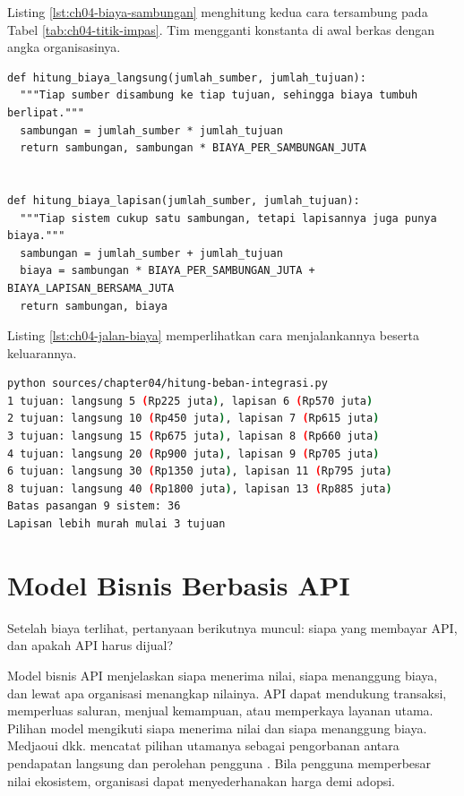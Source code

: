 \begin{pendalaman}[title={Pendalaman Teknis (opsional): Menghitung Titik Impas}]
Listing \ref{lst:ch04-biaya-sambungan} menghitung kedua cara tersambung pada Tabel \ref{tab:ch04-titik-impas}.
Tim mengganti konstanta di awal berkas dengan angka organisasinya.

\begin{lstlisting}[style=ch04python, caption={Biaya dua cara tersambung, tersedia di \berkas{sources/chapter04/hitung-beban-integrasi.py}}, label={lst:ch04-biaya-sambungan}]
def hitung_biaya_langsung(jumlah_sumber, jumlah_tujuan):
  """Tiap sumber disambung ke tiap tujuan, sehingga biaya tumbuh berlipat."""
  sambungan = jumlah_sumber * jumlah_tujuan
  return sambungan, sambungan * BIAYA_PER_SAMBUNGAN_JUTA


def hitung_biaya_lapisan(jumlah_sumber, jumlah_tujuan):
  """Tiap sistem cukup satu sambungan, tetapi lapisannya juga punya biaya."""
  sambungan = jumlah_sumber + jumlah_tujuan
  biaya = sambungan * BIAYA_PER_SAMBUNGAN_JUTA + BIAYA_LAPISAN_BERSAMA_JUTA
  return sambungan, biaya
\end{lstlisting}

Listing \ref{lst:ch04-jalan-biaya} memperlihatkan cara menjalankannya beserta keluarannya.

\begin{lstlisting}[language=bash, xleftmargin=8pt, caption={Menjalankan perhitungan, memakai \berkas{sources/chapter04/hitung-beban-integrasi.py}}, label={lst:ch04-jalan-biaya}]
python sources/chapter04/hitung-beban-integrasi.py
1 tujuan: langsung 5 (Rp225 juta), lapisan 6 (Rp570 juta)
2 tujuan: langsung 10 (Rp450 juta), lapisan 7 (Rp615 juta)
3 tujuan: langsung 15 (Rp675 juta), lapisan 8 (Rp660 juta)
4 tujuan: langsung 20 (Rp900 juta), lapisan 9 (Rp705 juta)
6 tujuan: langsung 30 (Rp1350 juta), lapisan 11 (Rp795 juta)
8 tujuan: langsung 40 (Rp1800 juta), lapisan 13 (Rp885 juta)
Batas pasangan 9 sistem: 36
Lapisan lebih murah mulai 3 tujuan
\end{lstlisting}
\end{pendalaman}

\section{Model Bisnis Berbasis API}

Setelah biaya terlihat, pertanyaan berikutnya muncul: siapa yang membayar API, dan apakah API harus dijual?

Model bisnis API menjelaskan siapa menerima nilai, siapa menanggung biaya, dan lewat apa organisasi
menangkap nilainya. API dapat mendukung transaksi, memperluas saluran, menjual kemampuan, atau memperkaya
layanan utama. Pilihan model mengikuti siapa menerima nilai dan siapa menanggung biaya. Medjaoui dkk. mencatat
pilihan utamanya sebagai pengorbanan antara pendapatan langsung dan perolehan pengguna
\cite{medjaoui2021continuous}. Bila pengguna memperbesar nilai ekosistem, organisasi dapat menyederhanakan
harga demi adopsi.

